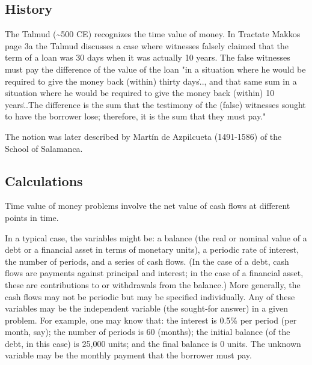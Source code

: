 \subsection{History}
\label{sss:hist-3cd1}




The Talmud (\textasciitilde{}500 CE) recognizes the time value of money. In Tractate
Makkos page 3a the Talmud discusses a case where witnesses falsely claimed that the term
of a loan was 30 days when it was actually 10 years. The false witnesses must pay the
difference of the value of the loan "in a situation where he would be required to give the
money back (within) thirty days\..., and that same sum in a situation where he would be
required to give the money back (within) 10 years\...The difference is the sum that the
testimony of the (false) witnesses sought to have the borrower lose; therefore, it is the
sum that they must pay."



The notion was later described by Martín de Azpilcueta (1491-1586) of the School of Salamanca.




\subsection{Calculations}
\label{sss:calc-9a7c}




Time value of money problems involve the net value of cash flows at different points in time.



In a typical case, the variables might be: a balance (the real or nominal value of a debt
or a financial asset in terms of monetary units), a periodic rate of interest, the number
of periods, and a series of cash flows. (In the case of a debt, cash flows are payments
against principal and interest; in the case of a financial asset, these are contributions
to or withdrawals from the balance.) More generally, the cash flows may not be periodic
but may be specified individually. Any of these variables may be the independent variable
(the sought-for answer) in a given problem. For example, one may know that: the interest
is 0.5\% per period (per month, say); the number of periods is 60 (months); the initial
balance (of the debt, in this case) is 25,000 units; and the final balance is 0 units. The
unknown variable may be the monthly payment that the borrower must pay.



